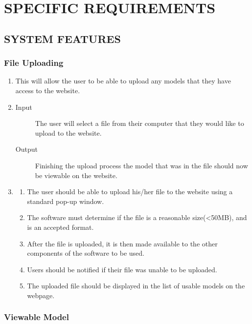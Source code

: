 \documentclass[letterpaper, 10pt, draftclsnofoot, compsoc, onecolumn]{IEEEtran}
\begin{document}
\section{SPECIFIC REQUIREMENTS}
\bigskip

\subsection{SYSTEM FEATURES}
\medskip

\subsubsection{File Uploading}

\begin{enumerate}
	\item This will allow the user to be able to upload any models that they have access to the website.

	\item
	\begin{description} 
		\item[Input] The user will select a file from their computer that they would like to upload to the website. 
		\item[Output] Finishing the upload process the model that was in the file should now be viewable on the website. 
	\end{description}

	\item
	\begin{enumerate}
		\item The user should be able to upload his/her file to the website using a standard pop-up window.
		\item The software must determine if the file is a reasonable size(<50MB), and is an accepted format. 
		\item After the file is uploaded, it is then made available to the other components of the software to be used.
		\item Users should be notified if their file was unable to be uploaded.
		\item The uploaded file should be displayed in the list of usable models on the webpage.
	\end{enumerate}
\end{enumerate}

\subsubsection{Viewable Model}
\end{document}
